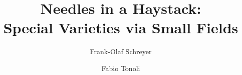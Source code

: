 
\title{Needles in a Haystack:\\Special Varieties via Small Fields}
\author{Frank-Olaf Schreyer
         \and Fabio Tonoli
        }

\newtheorem{conjecture}[theorem]{Conjecture}{\itshape}{\rm}



\newcommand{\AAA}{{\mathbb A}}
\newcommand{\BB}{{\mathbb B}}
\newcommand{\CC}{{\mathbb C}}
\newcommand{\DD}{{\mathbb D}}
\newcommand{\EE}{{\mathbb E}}
\newcommand{\FF}{{\mathbb F}}
\newcommand{\GG}{{\mathbb G}}
\newcommand{\II}{{\mathbb I}}
\newcommand{\JJ}{{\mathbb J}}
\newcommand{\KK}{{\mathbb K}}
\newcommand{\MM}{{\mathbb M}}
\newcommand{\NN}{{\mathbb N}}
\newcommand{\PP}{{\mathbb P}}
\newcommand{\QQ}{{\mathbb Q}}
\newcommand{\RR}{{\mathbb R}}
\renewcommand{\SS}{{\mathbb S}}
\newcommand{\Ss}{{\mathbf S}}
\newcommand{\TT}{{\mathbb T}}
\newcommand{\UU}{{\mathbb U}}
\newcommand{\VV}{{\mathbb V}}
\newcommand{\WW}{{\mathbb W}}
\newcommand{\XX}{{\mathbb X}}
\newcommand{\YY}{{\mathbb Y}}
\newcommand{\ZZ}{{\mathbb Z}}

\newcommand{\LL}{{\mathbb L}}
\newcommand{\HH}{{\mathbb H}}
\newcommand{\Syz}{{\rm{Syz}\;}}
\newcommand{\Sym}{{\rm{Sym}\;}}
\newcommand{\SSyz}{{\rm{Syz}}}
\newcommand{\spoly}{{\rm{spoly}}}
\newcommand{\Spe}{{Sp}}
\newcommand{\openC}{{\mathbb C}}
\newcommand{\ms}{{\rm{m}}}
\newcommand{\LS}{{\rm{L}}}
\newcommand{\IS}{{\rm{I}}}
\newcommand{\Loc}{{\rm{Loc}\,}}
\newcommand{\lcm}{{\rm{lcm}}}
\newcommand{\lc}{{\rm{lc}}}
\newcommand{\lm}{{\rm{lm}}}
\newcommand{\con}{{\rm{c}}}
\newcommand{\ext}{{\rm{e}}}
\newcommand{\ec}{{\rm{ec}}}
\newcommand{\ann}{{\rm{ann}}}
\newcommand{\equi}{{\rm{equi}}}
\newcommand{\Tor}{{\rm{Tor}}}
\newcommand{\rad}{{\rm{rad\;}}}
\newcommand{\ini}{{\rm{in}}}
\newcommand{\Hilb}{{\rm{Hilb}}}
\newcommand{\image}{{\rm{image}}}
\newcommand{\cliff}{{\rm{cliff}}}
\newcommand{\Pic}{{\rm{Pic}}}
\newcommand{\PR}{{\KK [x_1, \dots , x_n]}}


